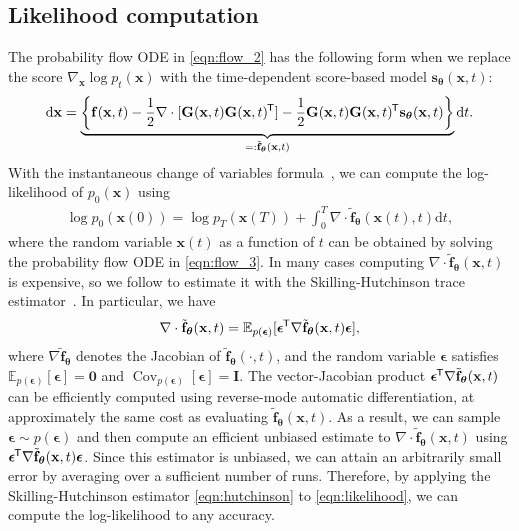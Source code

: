 \documentclass{article} \usepackage{iclr2021_conference,times}
\newcommand*{\tran}{^{\mkern-1.5mu\mathsf{T}}}
\newcommand{\bs}[1]{\boldsymbol{#1}}
\newcommand{\mbb}[1]{\mathbb{#1}}
\newcommand{\ud}{\mathrm{d}}
\newcommand{\bfx}{\mathbf{x}}
\newcommand{\bfI}{\mathbf{I}}
\newcommand{\bff}{\mathbf{f}}
\newcommand{\bfzero}{\mathbf{0}}
\newcommand{\bfe}{{\bs{\epsilon}}}
\newcommand{\bftheta}{{\boldsymbol{\theta}}}
\newcommand{\bfs}{\mathbf{s}}
\newcommand{\bfG}{\mathbf{G}}
\begin{document}
\subsection{Likelihood computation}\label{app:prob_flow_likelihood}
The probability flow ODE in \cref{eqn:flow_2} has the following form when we replace the score $\nabla_\bfx \log p_t(\bfx)$ with the time-dependent score-based model $\bfs_\bftheta(\bfx, t)$:
\begin{align}
      \ud \bfx = \underbrace{\bigg\{\bff(\bfx, t) - \frac{1}{2} \nabla \cdot [\bfG(\bfx, t)\bfG(\bfx, t)\tran] - \frac{1}{2} \bfG(\bfx, t)\bfG(\bfx, t)\tran \bfs_\bftheta(\bfx, t)\bigg\}}_{=: \tilde{\bff}_\bftheta(\bfx, t)} \ud t. \label{eqn:flow_3}
\end{align}
With the instantaneous change of variables formula~\citep{chen2018neural}, we can compute the log-likelihood of $p_0(\bfx)$ using
\begin{align}
    \log p_0(\bfx(0)) = \log p_T(\bfx(T)) + \int_0^T \nabla \cdot \tilde{\bff}_\bftheta(\bfx(t), t) \ud t, \label{eqn:likelihood}
\end{align}
where the random variable $\bfx(t)$ as a function of $t$ can be obtained by solving the probability flow ODE in \cref{eqn:flow_3}. In many cases computing $\nabla \cdot \tilde{\bff}_\bftheta(\bfx, t)$ is expensive, so we follow \citet{grathwohl2018ffjord} to estimate it with the Skilling-Hutchinson trace estimator~\citep{skilling1989eigenvalues,hutchinson1990stochastic}. In particular, we have
\begin{align}
    \nabla \cdot \tilde{\bff}_\bftheta(\bfx, t) = \mbb{E}_{p(\bfe)}[\bfe\tran \nabla \tilde{\bff}_\bftheta(\bfx, t)\bfe], \label{eqn:hutchinson}
\end{align}
where $\nabla \tilde{\bff}_\bftheta$ denotes the Jacobian of $\tilde{\bff}_\bftheta(\cdot, t)$, and the random variable $\bfe$ satisfies $\mbb{E}_{p(\bfe)}[\bfe] = \bfzero$ and $\operatorname{Cov}_{p(\bfe)}[\bfe] = \bfI$. The vector-Jacobian product $\bfe\tran \nabla\tilde{\bff}_\bftheta(\bfx, t)$ can be efficiently computed using reverse-mode automatic differentiation, at approximately the same cost as evaluating $\tilde{\bff}_\bftheta(\bfx, t)$. As a result, we can sample $\bfe \sim p(\bfe)$ and then compute an efficient unbiased estimate to $\nabla \cdot \tilde{\bff}_\bftheta(\bfx, t)$ using $\bfe\tran \nabla \tilde{\bff}_\bftheta(\bfx, t) \bfe$. Since this estimator is unbiased, we can attain an arbitrarily small error by averaging over a sufficient number of runs. Therefore, by applying the Skilling-Hutchinson estimator \cref{eqn:hutchinson} to \cref{eqn:likelihood}, we can compute the log-likelihood to any accuracy.
\end{document}
